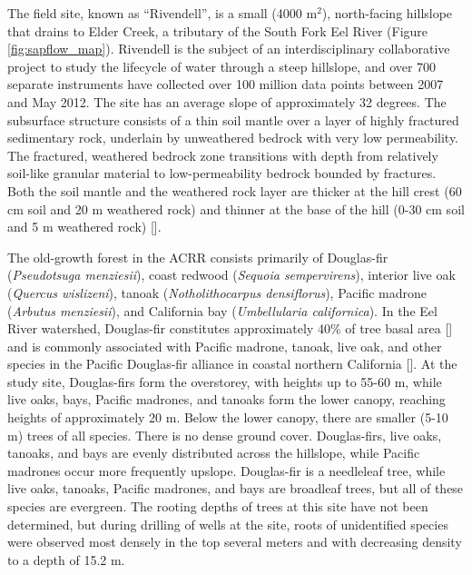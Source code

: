 The field site, known as ``Rivendell'', is a small (4000 m$^2$), north-facing hillslope that drains to Elder Creek, a tributary of the South Fork Eel River (Figure \ref{fig:sapflow_map}).  Rivendell is the subject of an interdisciplinary collaborative project to study the lifecycle of water through a steep hillslope, and over 700 separate instruments have collected over 100 million data points between 2007 and May 2012.  The site has an average slope of approximately 32 degrees.  The subsurface structure consists of a thin soil mantle over a layer of highly fractured sedimentary rock, underlain by unweathered bedrock with very low permeability.  The fractured, weathered bedrock zone transitions with depth from relatively soil-like granular material to low-permeability bedrock bounded by fractures.  Both the soil mantle and the weathered rock layer are thicker at the hill crest (60 cm soil and 20 m weathered rock) and thinner at the base of the hill (0-30 cm soil and 5 m weathered rock) [\cite{rempe2010}].

The old-growth forest in the ACRR consists primarily of Douglas-fir (\textit{Pseudotsuga menziesii}), coast redwood (\textit{Sequoia sempervirens}), interior live oak (\textit{Quercus wislizeni}), tanoak (\textit{Notholithocarpus densiflorus}), Pacific madrone (\textit{Arbutus menziesii}), and California bay (\textit{Umbellularia californica}).  In the Eel River watershed, Douglas-fir constitutes approximately 40\% of tree basal area [\cite{woudenberg2010forest}] and is commonly associated with Pacific madrone, tanoak, live oak, and other species in the Pacific Douglas-fir alliance in coastal northern California [\cite{usda}].  At the study site, Douglas-firs form the overstorey, with heights up to 55-60 m, while live oaks, bays, Pacific madrones, and tanoaks form the lower canopy, reaching heights of approximately 20 m.  Below the lower canopy, there are smaller (5-10 m) trees of all species. There is no dense ground cover. Douglas-firs, live oaks, tanoaks, and bays are evenly distributed across the hillslope, while Pacific madrones occur more frequently upslope.  Douglas-fir is a needleleaf tree, while live oaks, tanoaks, Pacific madrones, and bays are broadleaf trees, but all of these species are evergreen. The rooting depths of trees at this site have not been determined, but during drilling of wells at the site, roots of unidentified species were observed most densely in the top several meters and with decreasing density to a depth of 15.2 m.

